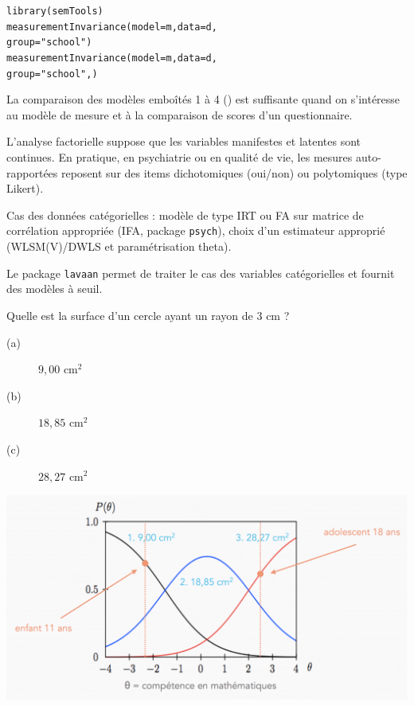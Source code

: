 
\begin{alltt}
library(semTools)
measurementInvariance(model = m, data = d, 
                      group = "school") \hfill {}
measurementInvariance(model = m, data = d, 
                      group = "school", ) \hfill {}
\end{alltt}

La comparaison des modèles emboîtés 1 à 4 (\texttt{}) est suffisante
quand on s'intéresse au modèle de mesure et à la comparaison de scores d'un
questionnaire.

L'analyse factorielle suppose que les variables manifestes et latentes sont
continues. En pratique, en psychiatrie ou en qualité de vie, les mesures
auto-rapportées reposent sur des items dichotomiques (oui/non) ou polytomiques
(type Likert).

Cas des données catégorielles : modèle de type IRT ou FA sur matrice de
corrélation appropriée (IFA, package \texttt{psych}), choix d'un estimateur
approprié (WLSM(V)/DWLS et paramétrisation theta\autocite{muthen93}).

Le package \texttt{lavaan} permet de traiter le cas des variables catégorielles
et fournit des modèles à seuil\autocite[chap.~6]{beaujean14}.


Quelle est la surface d'un cercle ayant un rayon de 3 cm ?
\begin{description}
\item[(a)] $9,00$ cm$^2$
\item[(b)] $18,85$ cm$^2$
\item[(c)] $28,27$ cm$^2$  
\end{description}

\foilhead{}

{\centering \includegraphics[width=.85\textwidth]{figs/math.eps}\par}


